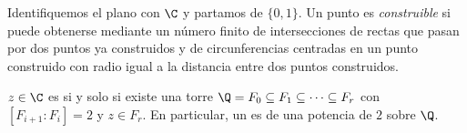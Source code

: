 \begin{definition}\label{def:b3:galois:constructible}
Identifiquemos el plano con $\C$ y partamos de $\{0, 1\}$. Un punto es
\emph{construible} si puede obtenerse mediante
un número finito de intersecciones de rectas que pasan por dos puntos ya
construidos y de circunferencias centradas en un punto construido con
radio igual a la distancia entre dos puntos construidos.
\end{definition}

\begin{theorem}[Wantzel]\label{thm:b3:galois:wantzel}
$z \in \C$ es  si y
solo si existe una torre $\Q = F_0
\subseteq F_1 \subseteq \dots \subseteq F_r$ con $[F_{i+1} :
F_i] = 2$ y $z \in F_r$. En particular, un
 es
 de
 una potencia de $2$ sobre
$\Q$.
\end{theorem}

